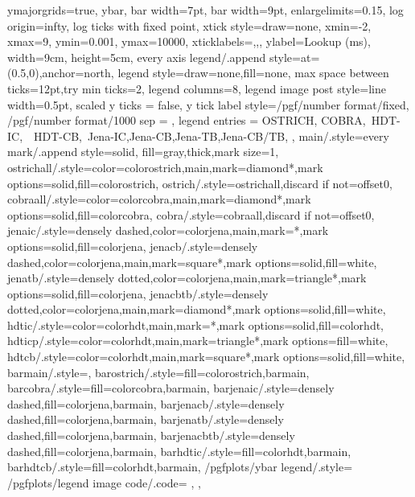 {{      ymajorgrids=true,
      ybar,
      bar width=7pt,
      bar width=9pt,
      enlargelimits=0.15,
      log origin=infty,
      log ticks with fixed point,
      xtick style={draw=none},
      xmin=-2,
      xmax=9,
      ymin=0.001,
      ymax=10000,
      xticklabels={,,},
      ylabel={Lookup (ms)},
      width=9cm,
      height=5cm,
      every axis legend/.append style={at={(0.5,0)},anchor=north},
      legend style={draw=none,fill=none},
      max space between ticks=12pt,try min ticks=2,
      legend columns=8,
      legend image post style={line width=0.5pt},
      scaled y ticks = false,
      y tick label style={/pgf/number format/fixed, /pgf/number format/1000 sep = \thinspace},
      legend entries = {OSTRICH, COBRA,\ HDT-IC,\ \ HDT-CB,\ Jena-IC,Jena-CB,Jena-TB,Jena-CB/TB,}
  },
  main/.style={every mark/.append style={solid, fill=gray},thick,mark size=1},
  ostrichall/.style={color=colorostrich,main,mark=diamond*,mark options={solid,fill=colorostrich}},
  ostrich/.style={ostrichall,discard if not={offset}{0}},
  cobraall/.style={color=colorcobra,main,mark=diamond*,mark options={solid,fill=colorcobra}},
  cobra/.style={cobraall,discard if not={offset}{0}},
  jenaic/.style={densely dashed,color=colorjena,main,mark=*,mark options={solid,fill=colorjena}},
  jenacb/.style={densely dashed,color=colorjena,main,mark=square*,mark options={solid,fill=white}},
  jenatb/.style={densely dotted,color=colorjena,main,mark=triangle*,mark options={solid,fill=colorjena}},
  jenacbtb/.style={densely dotted,color=colorjena,main,mark=diamond*,mark options={solid,fill=white}},
  hdtic/.style={color=colorhdt,main,mark=*,mark options={solid,fill=colorhdt}},
  hdticp/.style={color=colorhdt,main,mark=triangle*,mark options={fill=white}},
  hdtcb/.style={color=colorhdt,main,mark=square*,mark options={solid,fill=white}},
  barmain/.style={},
  barostrich/.style={fill=colorostrich,barmain},
  barcobra/.style={fill=colorcobra,barmain},
  barjenaic/.style={densely dashed,fill=colorjena,barmain},
  barjenacb/.style={densely dashed,fill=colorjena,barmain},
  barjenatb/.style={densely dashed,fill=colorjena,barmain},
  barjenacbtb/.style={densely dashed,fill=colorjena,barmain},
  barhdtic/.style={fill=colorhdt,barmain},
  barhdtcb/.style={fill=colorhdt,barmain},
  /pgfplots/ybar legend/.style={
      /pgfplots/legend image code/.code={%
         },
  },
}
